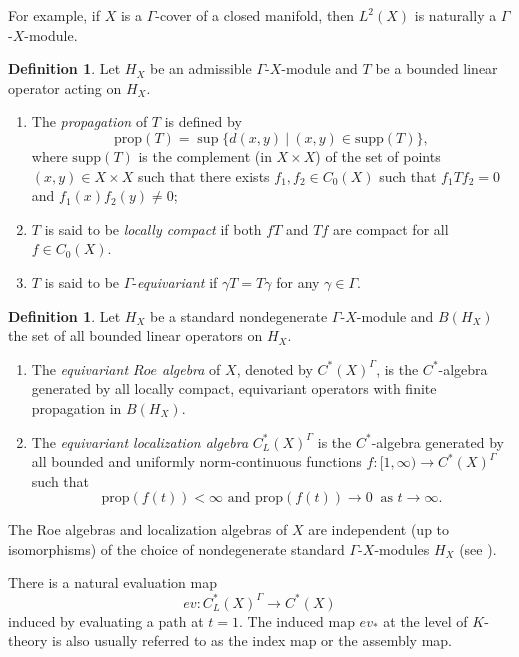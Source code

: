 \documentclass[12pt, reqno]{amsart}
\theoremstyle{plain}%
\theoremstyle{definition}
\newtheorem{definition}[theorem]{Definition}
\theoremstyle{remark}
\numberwithin{equation}{section}
\newcommand{\prop}{\mathrm{prop}}
\newcommand{\ev}{ev}
\begin{document}
For example, if $X$ is a $\Gamma$-cover of a closed manifold, then $L^2(X)$ is naturally a $\Gamma$-$X$-module.

\begin{definition}\label{def:prop-locallycompact}
	Let $H_X$ be an admissible $\Gamma$-$X$-module and $T$ be a bounded linear operator acting on $H_X$.
	\begin{enumerate}
		\item The \emph{propagation} of $T$ is defined by
		$$
		\prop(T)=\sup\{d(x,y) ~|~ (x,y)\in \text{supp}(T) \},
		$$
		where $\text{supp}(T)$ is the complement (in $X\times X$) of the set of points $(x,y) \in X\times X$ such that there exists $f_1,f_2\in C_0(X)$ such that $f_1Tf_2=0$ and $f_1(x)f_2(y)\neq 0$;
		\item $T$ is said to be \emph{locally compact} if both $fT$ and $Tf$ are compact for all $f\in C_0(X)$.
		\item $T$ is said to be $\Gamma$-\emph{equivariant} if $\gamma T=T\gamma$ for any $\gamma\in\Gamma$.
	\end{enumerate}
\end{definition}


\begin{definition}\label{def roe and localization}
	Let $H_X$ be a standard nondegenerate $\Gamma$-$X$-module and $B(H_X)$ the set of all bounded linear operators on $H_X$.
	\begin{enumerate}
		\item The \emph{equivariant $Roe$ algebra} of $X$, denoted by $C^*(X)^\Gamma$, is the $C^*$-algebra generated by all locally compact, equivariant operators with finite propagation in $B(H_X)$.
		\item The \emph{equivariant localization algebra} $C_L^*(X)^\Gamma$ is the $C^*$-algebra generated by all bounded and uniformly norm-continuous functions $f\colon [1,\infty)\to C^*(X)^\Gamma$ such that 	
		\[
		\prop(f(t))<\infty \text{ and }\prop(f(t))\to 0\  \text{~as~}  t \to \infty.
		\]
	\end{enumerate}
\end{definition}
The Roe algebras and localization algebras of $X$ are independent (up to isomorphisms) of the choice of nondegenerate standard $\Gamma$-$X$-modules  $H_X$ (see \cite[Proposition 3.7]{Yulocalization}). 

There is a natural evaluation map
$$\ev\colon C^*_L(X)^\Gamma\to C^*(X)$$
induced by evaluating a path at $t=1$. The induced map $\ev_*$ at the level of $K$-theory is also usually referred to as the index map or the assembly map.
\end{document}
